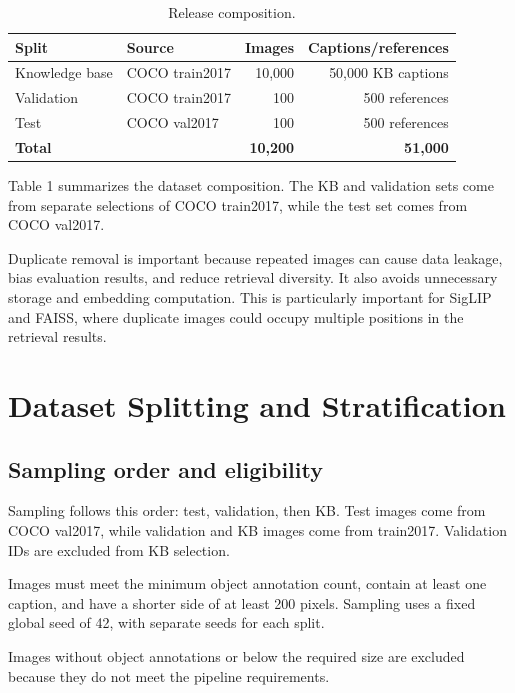 \documentclass{article}
\begin{document}
\begin{table}[H]
\centering
\caption{Release composition.}
\label{tab:release-composition}
\begin{tabular}{llrr}
\toprule
Split & Source & Images & Captions/references \\
\midrule
Knowledge base & COCO train2017 & 10,000 & 50,000 KB captions \\
Validation & COCO train2017 & 100 & 500 references \\
Test & COCO val2017 & 100 & 500 references \\
\midrule
\textbf{Total} & & \textbf{10,200} & \textbf{51,000} \\
\bottomrule
\end{tabular}
\end{table}

Table 1 summarizes the dataset composition. The KB and validation
sets come from separate selections of COCO train2017, while the test
set comes from COCO val2017.

Duplicate removal is important because repeated images can cause data
leakage, bias evaluation results, and reduce retrieval diversity.
It also avoids unnecessary storage and embedding computation.
This is particularly important for SigLIP and FAISS, where duplicate
images could occupy multiple positions in the retrieval results.


\section{Dataset Splitting and
Stratification}\label{dataset-splitting-and-stratification}

\subsection{Sampling order and
eligibility}\label{sampling-order-and-eligibility}

Sampling follows this order: test, validation, then KB. Test images
come from COCO val2017, while validation and KB images come from
train2017. Validation IDs are excluded from KB selection.

Images must meet the minimum object annotation count, contain at least
one caption, and have a shorter side of at least 200 pixels. Sampling
uses a fixed global seed of 42, with separate seeds for each split.

Images without object annotations or below the required size are
excluded because they do not meet the pipeline requirements.
\end{document}
